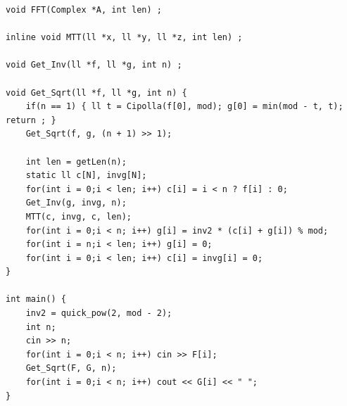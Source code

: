\documentclass[twoside]{article}
\begin{document}
\begin{lstlisting}
void FFT(Complex *A, int len) ;

inline void MTT(ll *x, ll *y, ll *z, int len) ;

void Get_Inv(ll *f, ll *g, int n) ;

void Get_Sqrt(ll *f, ll *g, int n) {
    if(n == 1) { ll t = Cipolla(f[0], mod); g[0] = min(mod - t, t); return ; }
    Get_Sqrt(f, g, (n + 1) >> 1);

    int len = getLen(n);
    static ll c[N], invg[N];
    for(int i = 0;i < len; i++) c[i] = i < n ? f[i] : 0;
    Get_Inv(g, invg, n);
    MTT(c, invg, c, len);
    for(int i = 0;i < n; i++) g[i] = inv2 * (c[i] + g[i]) % mod;
    for(int i = n;i < len; i++) g[i] = 0;
    for(int i = 0;i < len; i++) c[i] = invg[i] = 0;
}

int main() {
    inv2 = quick_pow(2, mod - 2);
    int n;
    cin >> n;
    for(int i = 0;i < n; i++) cin >> F[i];
    Get_Sqrt(F, G, n);
    for(int i = 0;i < n; i++) cout << G[i] << " ";
}\end{lstlisting}
\end{document}
